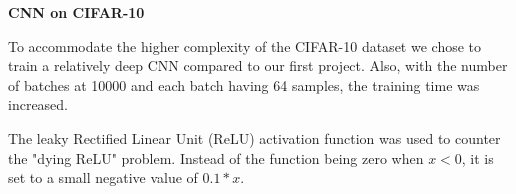 \documentclass{article}
\begin{document}
\begin{enumerate}
	\begin{item}
		\textbf{CNN on CIFAR-10}
	\end{item}

	\begin{enumerate}
		
		
		\begin{item}
			To accommodate the higher complexity of the CIFAR-10 dataset we chose to train a relatively deep CNN compared to our first project.  
			Also, with the number of batches at 10000 and each batch having 64 samples, the training time was increased.
			
			The leaky Rectified Linear Unit (ReLU) activation function was used to counter the "dying ReLU" problem. Instead of the function being zero when $x < 0$, it is set to a small negative value of $ 0.1 * x $. 
		\end{item}
		

\end{enumerate}
\end{enumerate}
\end{document}

